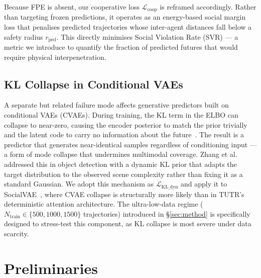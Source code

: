 \documentclass{article}
\begin{document}
Because FPE is absent, our cooperative loss \(\mathcal{L}_{\text{coop}}\) is
reframed accordingly.
Rather than targeting frozen predictions, it operates as an energy-based social
margin loss that penalises predicted trajectories whose inter-agent distances
fall below a safety radius \(r_{\text{ped}}\).
This directly minimises Social Violation Rate (SVR) --- a metric we introduce
to quantify the fraction of predicted futures that would require physical
interpenetration.

\subsection{KL Collapse in Conditional VAEs}

A separate but related failure mode affects generative predictors built on
conditional VAEs (CVAEs).
During training, the KL term in the ELBO can collapse to near-zero, causing
the encoder posterior to match the prior trivially and the latent code to carry
no information about the future~\cite{lucas2019elbo}.
The result is a predictor that generates near-identical samples regardless of
conditioning input --- a form of mode collapse that undermines multimodal
coverage.
Zhang et al.~\cite{zhang2025openworld} addressed this in object detection with
a dynamic KL prior that adapts the target distribution to the observed scene
complexity rather than fixing it as a standard Gaussian.
We adopt this mechanism as \(\mathcal{L}_{\text{KL\_dyn}}\) and apply it to
SocialVAE~\cite{xu2022socialvae}, where CVAE collapse is structurally more
likely than in TUTR's deterministic attention architecture.
The ultra-low-data regime (\(N_{\text{train}} \in \{500, 1000, 1500\}\)
trajectories) introduced in \S\ref{sec:method} is specifically designed to
stress-test this component, as KL collapse is most severe under data scarcity.


\section{Preliminaries}
\label{sec:prelim}
\end{document}
